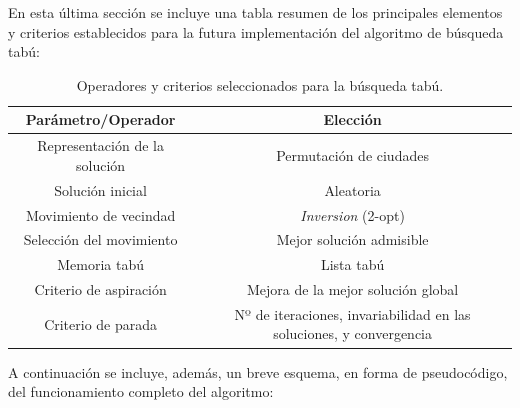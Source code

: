 En esta última sección se incluye una tabla resumen de los principales elementos y criterios establecidos para la futura
implementación del algoritmo de búsqueda tabú:

\begin{table}[H]
  \renewcommand{\arraystretch}{1.3}
  \caption{Operadores y criterios seleccionados para la búsqueda tabú.}
  \label{tab:ts_decisions}
  \begin{center}
    \begin{tabular}{|c|c|}
      \hline
      \textbf{Parámetro/Operador} & \textbf{Elección} \\
      \hline
      Representación de la solución & Permutación de ciudades \\
      \hline
      Solución inicial & Aleatoria \\
      \hline
      Movimiento de vecindad & \textit{Inversion} (2-opt) \\
      \hline
      Selección del movimiento & Mejor solución admisible \\
      \hline
      Memoria tabú & Lista tabú \\
      \hline
      Criterio de aspiración & Mejora de la mejor solución global \\
      \hline
      Criterio de parada & Nº de iteraciones, invariabilidad en las soluciones, y convergencia \\
      \hline
    \end{tabular}
  \end{center}
\end{table}

A continuación se incluye, además, un breve esquema, en forma de pseudocódigo, del funcionamiento completo del algoritmo:

\vspace{1.5em}

\begin{algorithm}[H]
\caption{Pseudocódigo de la búsqueda tabú propuesta para el TSP}
\label{alg:ts}
\DontPrintSemicolon


\end{algorithm}

